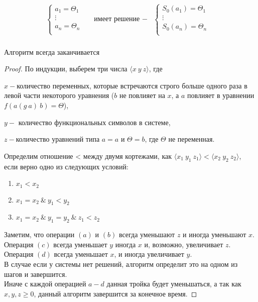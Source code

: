 	\begin{align*}
		\begin{cases}
			a_1=\Theta_1&\\
			\vdots&\\
			a_n=\Theta_n&\\
		\end{cases} & \text{имеет решение }-&\begin{cases}
			S_0(a_1)=\Theta_1&\\
			\vdots&\\
			S_0(a_n)=\Theta_n&\\
		\end{cases}\\
	\end{align*}
	\begin{statement}Алгоритм всегда заканчивается\end{statement}
	\begin{proof}По индукции, выберем три числа $ \big \langle x\:y\:z\big \rangle$, где\par $x-$количество переменных, которые встречаются строго больше одного раза в левой части некоторого уравнения ($b$ не повлияет на $x$, а $a$ повлияет в уравнении $f(a(g\:a)\:b)=\Theta$),\par $y-$ количество функциональных символов в системе,\par $z-$количество уравнений типа $a=a$ и $\Theta=b$, где $\Theta$ не переменная.\par Определим отношение <  между двумя кортежами,	 как $\big \langle x_1\:y_1\:z_1\big \rangle < \big \langle x_2\:y_2\:z_2\big \rangle$, если верно одно из следующих условий:\\ \begin{enumerate}
	\item $x_1 < x_2$
	\item $x_1 = x_2 \:\& \:y_1 < y_2$
	\item $x_1 = x_2 \:\&  \:y_1 = y_2 \:\& \:z_1 < z_2$
	\end{enumerate}
		Заметим, что операции $(a)$ и $(b)$ всегда уменьшают $z$ и иногда уменьшают $x$.\\ Операция $(c)$ всегда уменьшает $y$ иногда $x$ и, возможно, увеличивает $z$. \\
		Операция $(d)$ всегда уменьшает $x$, и иногда увеличивает $y$. \\
		В случае если у системы нет решений, алгоритм определит это на одном из шагов и завершится. \\
		Иначе с каждой операцией $a-d$ данная тройка будет уменьшаться, а так как $x,y,z\geq 0$, данный алгоритм завершится за конечное время.
		\end{proof} 

